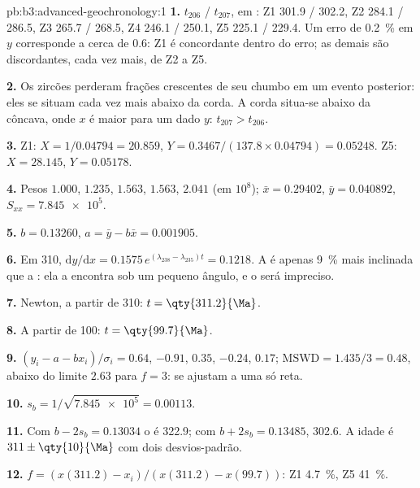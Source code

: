 \begin{solution}{pb:b3:advanced-geochronology:1}
\textbf{1.} $t_{206}$ / $t_{207}$, em \unit{\Ma}: Z1 301.9 / 302.2, Z2 284.1 /
286.5, Z3 265.7 / 268.5, Z4 246.1 / 250.1, Z5 225.1 / 229.4. Um erro de
\qty{0.2}{\percent} em $y$ corresponde a cerca de \qty{0.6}{\Ma}: Z1 é concordante dentro
do erro; as demais são discordantes, cada vez mais, de Z2 a Z5.

\textbf{2.} Os zircões perderam frações crescentes de seu chumbo em um
evento posterior: eles se situam cada vez mais abaixo da corda. A corda situa-se abaixo da
 côncava, onde $x$ é maior para um dado $y$: $t_{207} > t_{206}$.

\textbf{3.} Z1: $X = 1/0.04794 = 20.859$, $Y = 0.3467/(137.8\times0.04794) =
0.05248$. Z5: $X = 28.145$, $Y = 0.05178$.

\textbf{4.} Pesos $1.000$, $1.235$, $1.563$, $1.563$, $2.041$ (em
$10^8$); $\bar x = 0.29402$, $\bar y = 0.040892$, $S_{xx} = \num{7.845e5}$.

\textbf{5.} $b = 0.13260$, $a = \bar y - b\bar x = 0.001905$.

\textbf{6.} Em \qty{310}{\Ma}, $\mathrm dy/\mathrm dx = 0.1575\,
e^{(\lambda_{238} - \lambda_{235})t} = 0.1218$. A  é apenas
\qty{9}{\percent} mais inclinada que a : ela a encontra sob um pequeno ângulo,
e o  será impreciso.

\textbf{7.} Newton, a partir de \qty{310}{\Ma}: $t = \qty{311.2}{\Ma}$.

\textbf{8.} A partir de \qty{100}{\Ma}: $t = \qty{99.7}{\Ma}$.

\textbf{9.} $(y_i - a - bx_i)/\sigma_i = 0.64$, $-0.91$, $0.35$, $-0.24$,
$0.17$; $\mathrm{MSWD} = 1.435/3 = 0.48$, abaixo do limite $2.63$ para $f = 3$:
se ajustam a uma só reta.

\textbf{10.} $s_b = 1/\sqrt{\num{7.845e5}} = 0.00113$.

\textbf{11.} Com $b - 2s_b = 0.13034$ o  é
\qty{322.9}{\Ma}; com $b + 2s_b = 0.13485$, \qty{302.6}{\Ma}. A idade é
$311 \pm \qty{10}{\Ma}$ com dois desvios-padrão.

\textbf{12.} $f = (x(311.2) - x_i)/(x(311.2) - x(99.7))$: Z1 \qty{4.7}{\percent},
Z5 \qty{41}{\percent}.


\end{solution}
